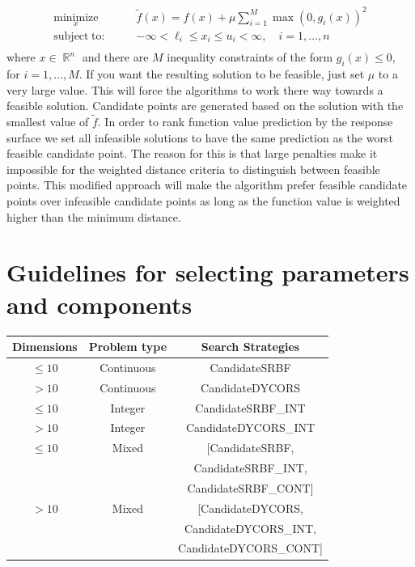 \documentclass[]{article}
\DeclareMathOperator{\Rb}{\mathbb{R}}
\begin{document}
\begin{itemize}
\begin{align*}
\underset{x}{\operatorname{minimize}} \qquad &\widetilde{f}(x)=f(x)+\mu \sum_{i=1}^M \max(0,g_i(x))^2 \\
\operatorname{subject\;to:} \qquad &-\infty<\ell_i \leq x_i \leq u_i<\infty, \quad i = 1,\ldots,n \\
\end{align*}
where $x \in \Rb^n$ and there are $M$ inequality constraints of the form $g_i(x) \leq 0,$ for $i=1,\ldots,M$. If you want the resulting solution to be feasible, just set $\mu$ to a very large value. This will force the algorithms to work there way towards a feasible solution. Candidate points are generated based on the solution with the smallest value of $\widetilde{f}$. In order to rank function value prediction by the response surface we set all infeasible solutions to have the same prediction as the worst feasible candidate point. The reason for this is that large penalties make it impossible for the weighted distance criteria to distinguish between feasible points. This modified approach will make the algorithm prefer feasible candidate points over infeasible candidate points as long as the function value is weighted higher than the minimum distance.
\end{itemize}

\section{Guidelines for selecting parameters and components}
\begin{center}
\begin{tabular}{ c c | c }
  \hline			
Dimensions & Problem type & Search Strategies \\
  \hline  
  $\leq 10$ & Continuous & CandidateSRBF \\
   $> 10$ & Continuous & CandidateDYCORS\\
   \hline
     $\leq 10$ & Integer & CandidateSRBF\_INT \\
   $> 10$ & Integer & CandidateDYCORS\_INT \\
   \hline
   $\leq 10$ & Mixed &  \multirow{1}{*}{[CandidateSRBF,} \\ & & CandidateSRBF\_INT,  \\ & & CandidateSRBF\_CONT] \\
      $> 10$ & Mixed &  \multirow{1}{*}{[CandidateDYCORS,} \\ & & CandidateDYCORS\_INT, \\ & & CandidateDYCORS\_CONT] \\
      \hline
\end{tabular}
\end{center}
\end{document}
